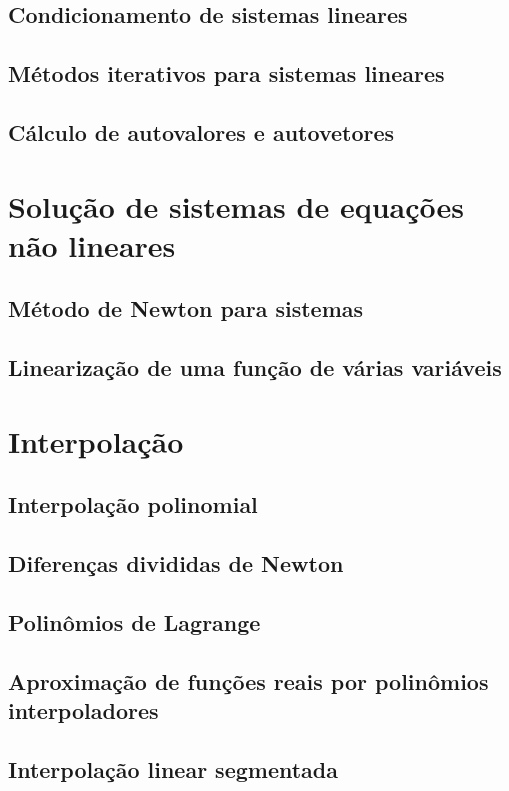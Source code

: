 \documentclass[12pt]{article}
\theoremstyle{plain}
\theoremstyle{definition}
\theoremstyle{remark}
\begin{document}
\subsection{Condicionamento de sistemas lineares}
\subsection{Métodos iterativos para sistemas lineares}
\subsection{Cálculo de autovalores e autovetores}

\section{Solução de sistemas de equações não lineares}

\subsection{Método de Newton para sistemas}
\subsection{Linearização de uma função de várias variáveis}

\section{Interpolação}

\subsection{Interpolação polinomial}
\subsection{Diferenças divididas de Newton}
\subsection{Polinômios de Lagrange}
\subsection{Aproximação de funções reais por polinômios interpoladores}
\subsection{Interpolação linear segmentada}
\end{document}
